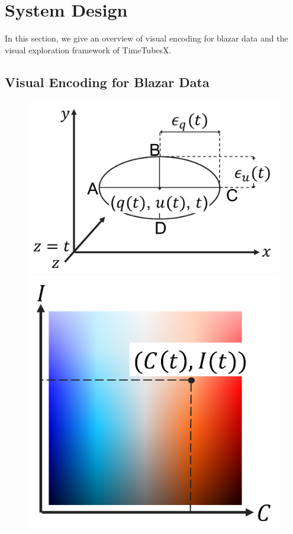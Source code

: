 \section{System Design\label{sec:systemDesign}}
In this section, we give an overview of visual encoding for blazar data and the visual exploration framework of TimeTubesX.

\subsection{Visual Encoding for Blazar Data}\label{sec:VisualEncoding}
\begin{figure}[tb]
    \begin{minipage}{0.34\linewidth}
        \centering
        \includegraphics[width=.99\linewidth]{vgtc_journal_latex/figures/howtoplot.pdf}
    \end{minipage}
    \begin{minipage}{0.26\linewidth}
        \centering
        \includegraphics[width=.99\linewidth]{vgtc_journal_latex/figures/colormap.pdf}

\end{minipage}
\end{figure}
